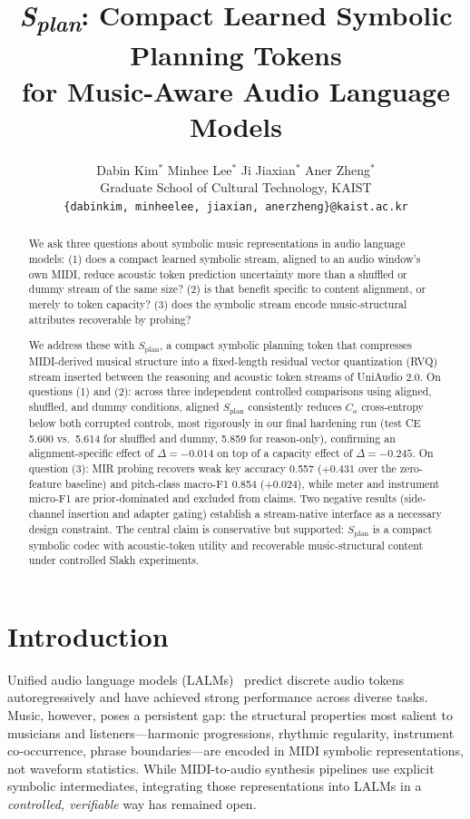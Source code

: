 \documentclass[11pt]{article}
\title{\textit{S\textsubscript{plan}}: Compact Learned Symbolic Planning Tokens\\
for Music-Aware Audio Language Models}
\author{
  Dabin Kim$^*$ \quad Minhee Lee$^*$ \quad Ji Jiaxian$^*$ \quad Aner Zheng$^*$ \\
  Graduate School of Cultural Technology, KAIST \\
  \texttt{\{dabinkim, minheelee, jiaxian, anerzheng\}@kaist.ac.kr}
}
\newcommand{\splan}{$S_{\mathrm{plan}}$}
\newcommand{\Camath}{C_a}
\begin{document}
\maketitle

\begin{abstract}
We ask three questions about symbolic music representations in audio language models:
(1) does a compact learned symbolic stream, aligned to an audio window's own MIDI,
reduce acoustic token prediction uncertainty more than a shuffled or dummy stream of
the same size?
(2) is that benefit specific to content alignment, or merely to token capacity?
(3) does the symbolic stream encode music-structural attributes recoverable by probing?

We address these with \splan{}, a compact symbolic planning token that compresses
MIDI-derived musical structure into a fixed-length residual vector quantization (RVQ)
stream inserted between the reasoning and acoustic token streams of UniAudio 2.0.
On questions (1) and (2): across three independent controlled comparisons using aligned,
shuffled, and dummy conditions, aligned \splan{} consistently reduces $\Camath$
cross-entropy below both corrupted controls, most rigorously in our final hardening run
(test CE 5.600 vs.\ 5.614 for shuffled and dummy, 5.859 for reason-only), confirming
an alignment-specific effect of $\Delta = -0.014$ on top of a capacity effect of
$\Delta = -0.245$.
On question (3): MIR probing recovers weak key accuracy 0.557 ($+0.431$ over the
zero-feature baseline) and pitch-class macro-F1 0.854 ($+0.024$), while meter and
instrument micro-F1 are prior-dominated and excluded from claims.
Two negative results (side-channel insertion and adapter gating) establish a
stream-native interface as a necessary design constraint.
The central claim is conservative but supported: \splan{} is a compact symbolic codec
with acoustic-token utility and recoverable music-structural content under controlled
Slakh experiments.
\end{abstract}

\section{Introduction}

Unified audio language models (LALMs)~\citep{yang2024uniaudio,yang2026uniaudio2,rubenstein2023audiopalm,borsos2023audiolm}
predict discrete audio tokens autoregressively and have achieved strong performance
across diverse tasks.  Music, however, poses a persistent gap: the structural properties
most salient to musicians and listeners---harmonic progressions, rhythmic regularity,
instrument co-occurrence, phrase boundaries---are encoded in MIDI symbolic representations,
not waveform statistics.  While MIDI-to-audio synthesis pipelines use explicit symbolic
intermediates, integrating those representations into LALMs in a \emph{controlled,
verifiable} way has remained open.
\end{document}
